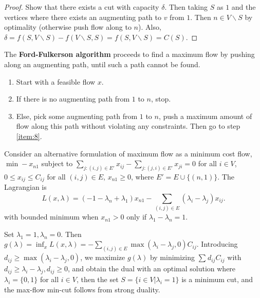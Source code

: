 \begin{proof}
  Show that there exists a cut with capacity $\delta$.  Then taking
  $S$ as $1$ and the vertices where there exists an augmenting path to
  $v$ from $1$.  Then $n \in V \backslash S$ by optimality (otherwise
  push flow along to $n$).  Also, $\delta = f(S, V \backslash S) - f(V
  \backslash S, S) = f(S, V \backslash S) = C(S)$.
\end{proof}

\begin{thm}
  \label{sec:maxim-flows-perf-3}
  The \textbf{Ford-Fulkerson algorithm} proceeds to find a maximum
  flow by pushing along an augmenting path, until such a path cannot
  be found.

  \begin{enumerate}
  \item Start with a feasible flow $x$.
  \item\label{item:8} If there is no augmenting path from $1$ to $n$, stop.
  \item\label{item:6} Else, pick some augmenting path from $1$ to $n$, push a
    maximum amount of flow along this path without violating any
    constraints.  Then go to step \ref{item:8}.
  \end{enumerate}
\end{thm}

\begin{defn}
  \label{sec:maxim-flows-perf-5}
  Consider an alternative formulation of maximum flow as a minimum
  cost flow, $\min -x_{n1}$ subject to $\sum_{j:(i, j) \in E'}^{}
  x_{ij} - \sum_{j: (j, i) \in E'}^{} x_{ji} = 0$ for all $i \in V$,
  $0 \leq x_{ij} \leq C_{ij}$ for all $(i, j) \in E$, $x_{n1} \geq 0$,
  where $E' = E \cup \{ (n, 1) \}$.  The Lagrangian is
  \begin{equation}
    \label{eq:12}
    L(x, \lambda) = (-1 - \lambda_{n} + \lambda_{1}) x_{n1} -
    \sum_{(i, j) \in E}^{} (\lambda_{i} - \lambda_{j}) x_{ij}.
  \end{equation} with bounded minimum when $x_{n1} > 0$ only if
  $\lambda_{1} - \lambda_{n} = 1$.

  Set $\lambda_{1} = 1, \lambda_{n} = 0$.  Then $g(\lambda) = \inf_{x}
  L(x, \lambda) = -\sum_{(i, j) \in E}^{} \max(\lambda_{i} -
  \lambda_{j}, 0) C_{ij}$.  Introducing $d_{ij} \geq \max(\lambda_{i}
  - \lambda_{j}, 0)$, we maximize $g(\lambda)$ by minimizing
  $\sum_{}^{} d_{ij} C_{ij}$ with $d_{ij} \geq \lambda_{i} -
  \lambda_{j}, d_{ij} \geq 0$, and obtain the dual with an optimal
  solution where $\lambda_{i} = \{ 0, 1 \} $ for all $i \in V$, then
  the set $S = \{ i \in V  | \lambda_{i} = 1\} $ is a minimum cut, and
  the max-flow min-cut follows from strong duality.
\end{defn}

